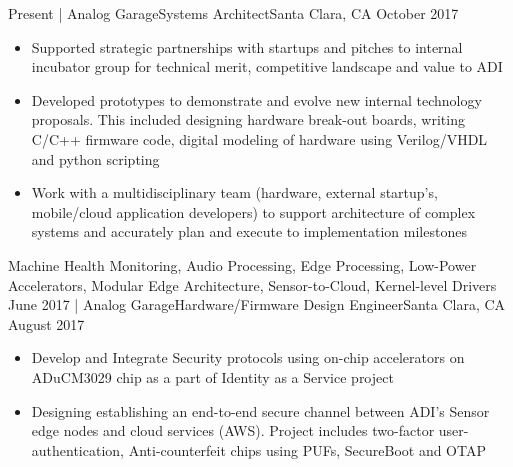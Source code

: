 %
%
%

\begin{experiences}
  \experience
    {Present}   {| Analog Garage}{Systems Architect}{Santa Clara, CA}
    {October 2017} {
                      \begin{itemize}
                        \item Supported strategic partnerships with startups and pitches to internal incubator group for technical merit, competitive landscape and value to ADI
                        \item Developed prototypes to demonstrate and evolve new internal technology proposals. This included designing hardware break-out boards, writing C/C++ firmware code, digital modeling of hardware using Verilog/VHDL and python scripting
                        \item Work with a multidisciplinary team (hardware, external startup’s, mobile/cloud application developers) to support architecture of complex systems and accurately plan and execute to implementation milestones\\
                      \end{itemize}
                    }
                    {Machine Health Monitoring, Audio Processing, Edge Processing, Low-Power Accelerators, Modular Edge Architecture, Sensor-to-Cloud, Kernel-level Drivers}
  \emptySeparator
  \experience
    {June 2017} {| Analog Garage}{Hardware/Firmware Design Engineer}{Santa Clara, CA}
    {August 2017}    {
                      \begin{itemize}
                        \item Develop and Integrate Security protocols using on-chip accelerators on ADuCM3029 chip as a part of Identity as a Service project
                        \item Designing establishing an end-to-end secure channel between ADI's Sensor edge nodes and cloud services (AWS). Project includes two-factor user-authentication, Anti-counterfeit chips using PUFs, SecureBoot and OTAP \\

\end{itemize}}
\end{experiences}
